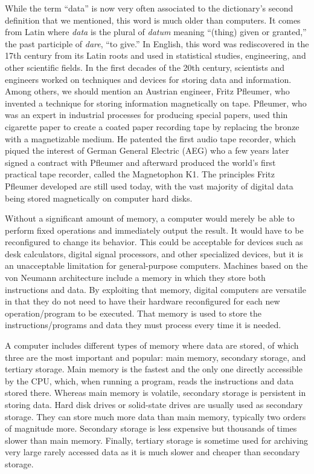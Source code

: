 While the term ``data'' is now very often associated to the dictionary's second definition that we mentioned, this word is much older than computers. It comes from Latin where \textit{data} is the plural of \textit{datum} meaning ``(thing) given or granted,'' the past participle of \textit{dare}, ``to give.'' In English, this word was rediscovered in the 17th century from its Latin roots and used in statistical studies, engineering, and other scientific fields. In the first decades of the 20th century, scientists and engineers worked on techniques and devices for storing data and information. Among others, we should mention an Austrian engineer, Fritz Pfleumer, who invented a technique for storing information magnetically on tape. Pfleumer, who was an expert in industrial processes for producing special papers, used thin cigarette paper to create a coated paper recording tape by replacing the bronze with a magnetizable medium. He patented the first audio tape recorder, which piqued the interest of German General Electric (AEG) who a few years later signed a contract with Pfleumer and afterward produced the world's first practical tape recorder, called the Magnetophon K1. The principles Fritz Pfleumer developed are still used today, with the vast majority of digital data being stored magnetically on computer hard disks.

Without a significant amount of memory, a computer would merely be able to perform fixed operations and immediately output the result. It would have to be reconfigured to change its behavior. This could be acceptable for devices such as desk calculators, digital signal processors, and other specialized devices, but it is an unacceptable limitation for general-purpose computers. Machines based on the von Neumann architecture include a memory in which they store both instructions and data. By exploiting that memory, digital computers are versatile in that they do not need to have their hardware reconfigured for each new operation/{\allowbreak}program to be executed. That memory is used to store the instructions/{\allowbreak}programs and data they must process every time it is needed.

A computer includes different types of memory where data are stored, of which three are the most important and popular: main memory, secondary storage, and tertiary storage. Main memory is the fastest and the only one directly accessible by the CPU, which, when running a program, reads the instructions and data stored there. Whereas main memory is volatile, secondary storage is persistent in storing data. Hard disk drives or solid-state drives are usually used as secondary storage. They can store much more data than main memory, typically two orders of magnitude more. Secondary storage is less expensive but thousands of times slower than main memory. Finally, tertiary storage is sometime used for archiving very large rarely accessed data as it is much slower and cheaper than secondary storage.

